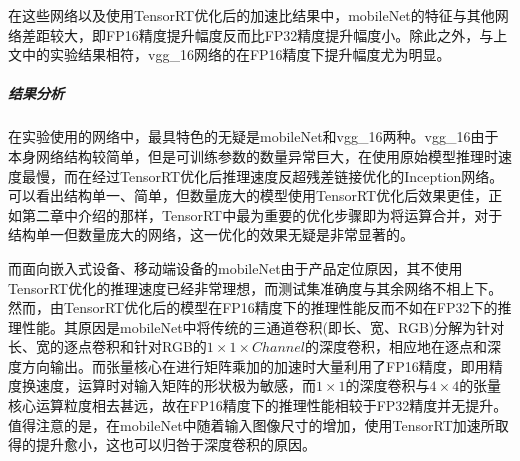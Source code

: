 \par 在这些网络以及使用TensorRT优化后的加速比结果中，mobileNet的特征与其他网络差距较大，即FP16精度提升幅度反而比FP32精度提升幅度小。除此之外，与上文中的实验结果相符，vgg\_16网络的在FP16精度下提升幅度尤为明显。
\subparagraph{结果分析}
\par 在实验使用的网络中，最具特色的无疑是mobileNet和vgg\_16两种。vgg\_16由于本身网络结构较简单，但是可训练参数的数量异常巨大，在使用原始模型推理时速度最慢，而在经过TensorRT优化后推理速度反超残差链接优化的Inception网络。可以看出结构单一、简单，但数量庞大的模型使用TensorRT优化后效果更佳，正如第二章中介绍的那样，TensorRT中最为重要的优化步骤即为将运算合并，对于结构单一但数量庞大的网络，这一优化的效果无疑是非常显著的。
\par 而面向嵌入式设备、移动端设备的mobileNet由于产品定位原因，其不使用TensorRT优化的推理速度已经非常理想，而测试集准确度与其余网络不相上下。然而，由TensorRT优化后的模型在FP16精度下的推理性能反而不如在FP32下的推理性能。其原因是mobileNet中将传统的三通道卷积(即长、宽、RGB)分解为针对长、宽的逐点卷积和针对RGB的$ 1\times 1\times Channel $的深度卷积，相应地在逐点和深度方向输出。而张量核心在进行矩阵乘加的加速时大量利用了FP16精度，即用精度换速度，运算时对输入矩阵的形状极为敏感，而$ 1\times 1 $的深度卷积与$ 4 \times 4 $的张量核心运算粒度相去甚远，故在FP16精度下的推理性能相较于FP32精度并无提升。值得注意的是，在mobileNet中随着输入图像尺寸的增加，使用TensorRT加速所取得的提升愈小，这也可以归咎于深度卷积的原因。

